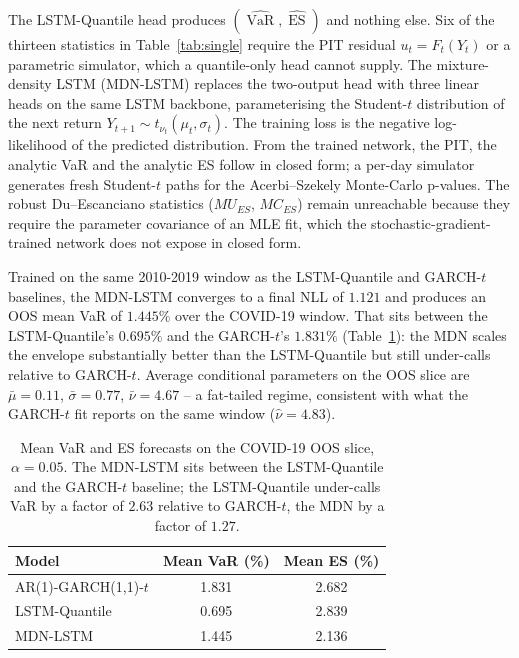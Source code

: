 \documentclass[11pt,a4paper]{article}
\newcommand{\VaR}{\operatorname{VaR}}
\newcommand{\ES}{\operatorname{ES}}
\theoremstyle{plain}
\begin{document}
The LSTM-Quantile head produces $(\widehat{\VaR}, \widehat{\ES})$ and
nothing else. Six of the thirteen statistics in
Table~\ref{tab:single} require the PIT residual $u_t = F_t(Y_t)$ or a
parametric simulator, which a quantile-only head cannot supply. The
mixture-density LSTM (MDN-LSTM) replaces the two-output head with
three linear heads on the same LSTM backbone, parameterising the
Student-$t$ distribution of the next return $Y_{t+1} \sim
t_{\nu_t}(\mu_t, \sigma_t)$. The training loss is the negative
log-likelihood of the predicted distribution. From the trained
network, the PIT, the analytic VaR and the analytic ES follow in
closed form; a per-day simulator generates fresh Student-$t$ paths
for the Acerbi--Szekely Monte-Carlo p-values. The robust
Du--Escanciano statistics ($MU_{ES}$, $MC_{ES}$) remain unreachable
because they require the parameter covariance of an MLE fit, which
the stochastic-gradient-trained network does not expose in closed
form.

Trained on the same 2010-2019 window as the LSTM-Quantile and
GARCH-$t$ baselines, the MDN-LSTM converges to a final NLL of
$1.121$ and produces an OOS mean VaR of $1.445\%$ over the COVID-19
window. That sits between the LSTM-Quantile's $0.695\%$ and the
GARCH-$t$'s $1.831\%$ (Table~\ref{tab:mdn-mean}): the MDN scales the
envelope substantially better than the LSTM-Quantile but still
under-calls relative to GARCH-$t$. Average conditional parameters on
the OOS slice are $\bar\mu = 0.11$, $\bar\sigma = 0.77$, $\bar\nu =
4.67$ -- a fat-tailed regime, consistent with what the
GARCH-$t$ fit reports on the same window ($\hat\nu = 4.83$).

\begin{table}[ht]
\centering
\caption{Mean VaR and ES forecasts on the COVID-19 OOS slice,
$\alpha = 0.05$. The MDN-LSTM sits between the LSTM-Quantile and the
GARCH-$t$ baseline; the LSTM-Quantile under-calls VaR by a factor of
$2.63$ relative to GARCH-$t$, the MDN by a factor of $1.27$.}
\label{tab:mdn-mean}
\small
\begin{tabular}{@{}lcc@{}}
\toprule
\textbf{Model} & \textbf{Mean VaR (\%)} & \textbf{Mean ES (\%)} \\
\midrule
AR(1)-GARCH(1,1)-$t$ & 1.831 & 2.682 \\
LSTM-Quantile        & 0.695 & 2.839 \\
MDN-LSTM             & 1.445 & 2.136 \\
\bottomrule
\end{tabular}
\end{table}
\end{document}
